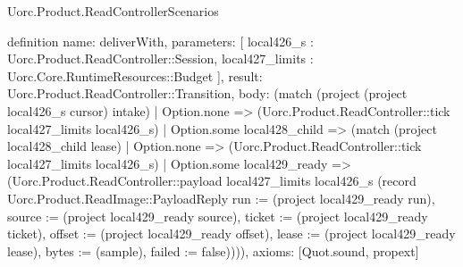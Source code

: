 \begin{lexlean}{Uorc.Product.ReadControllerScenarios}
\begin{semanticmodule}
definition{
  name: deliverWith,
  parameters: [
    local426_s : Uorc.Product.ReadController::Session,
    local427_limits : Uorc.Core.RuntimeResources::Budget
  ],
  result: Uorc.Product.ReadController::Transition,
  body: (match (project (project local426_s cursor) intake)
    | Option.none => (Uorc.Product.ReadController::tick local427_limits local426_s)
    | Option.some local428_child => (match (project local428_child lease)
      | Option.none => (Uorc.Product.ReadController::tick local427_limits local426_s)
      | Option.some local429_ready => (Uorc.Product.ReadController::payload local427_limits local426_s (record Uorc.Product.ReadImage::PayloadReply {run := (project local429_ready run), source := (project local429_ready source), ticket := (project local429_ready ticket), offset := (project local429_ready offset), lease := (project local429_ready lease), bytes := (sample), failed := false})))),
  axioms: [Quot.sound, propext]
}


\end{semanticmodule}
\end{lexlean}
